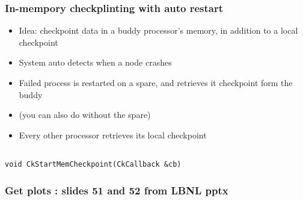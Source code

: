 \begin{frame}[fragile]
  \frametitle{In-mempory checkplinting with auto restart}
\begin{itemize}

\item Idea: checkpoint data in a buddy processor's memory, in addition
  to a local checkpoint
\item System auto detects when a node crashes
\item  Failed process is restarted on a spare, and retrieves it
  checkpoint form the buddy
\item (you can also do without the spare)
\item Every other processor retrieves its local checkpoint 
\end{itemize}

 \begin{lstlisting}[basicstyle=\footnotesize]

void CkStartMemCheckpoint(CkCallback &cb)
\end{lstlisting}

\end{frame}

\begin{frame}[fragile]
  \frametitle{Get plots : slides 51 and 52 from LBNL pptx }
\end{frame}

